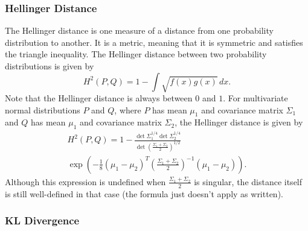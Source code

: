 \documentclass{article}
\newcommand*{\Pn}[1]{\left( #1 \right)}
\begin{document}
\subsubsection{Hellinger Distance}

The Hellinger distance is one measure of a distance from one probability
distribution to another.\cite{wikihell} It is a metric, meaning that it is
symmetric and satisfies the triangle inequality. The Hellinger distance between
two probability distributions is given by
\[
    H^2(P,Q)=1-\int \sqrt{f(x)g(x)}\,dx.
\]
Note that the Hellinger distance is always between $0$ and $1$. For
multivariate normal distributions $P$ and $Q$, where $P$ has mean $\mu_1$ and
covariance matrix $\Sigma_1$ and $Q$ has mean $\mu_1$ and covariance matrix
$\Sigma_2$, the Hellinger distance is given by \cite{pardo}
\begin{multline*}
    H^2(P,Q)=1-\frac{\det\Sigma_1^{1/4}\det\Sigma_2^{1/4}}
    {\det\Pn{\frac{\Sigma_1+\Sigma_2}{2}}^{1/2}}\\
    \exp\Pn{-\frac18(\mu_1-\mu_2)^T\Pn{\frac{\Sigma_1+\Sigma_2}{2}}^{-1}
    (\mu_1-\mu_2)}.
\end{multline*}
Although this expression is undefined when $\frac{\Sigma_1+\Sigma_2}{2}$ is
singular, the distance itself is still well-defined in that case (the formula
just doesn't apply as written).

\subsubsection{KL Divergence}
\end{document}
